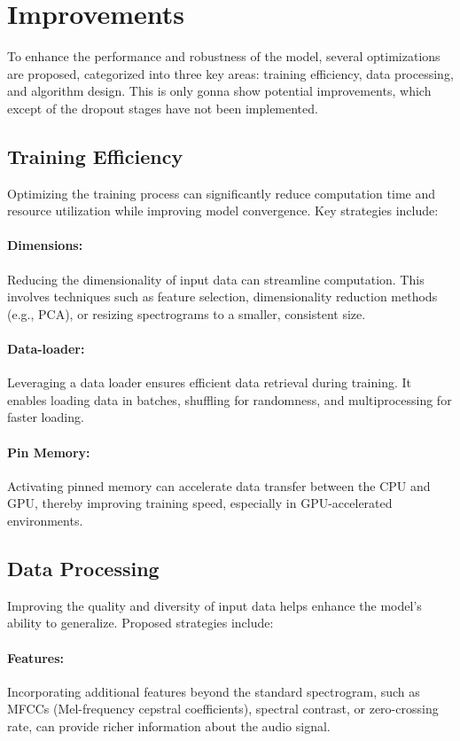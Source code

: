 \section{Improvements}
\label{sec:improvements}
To enhance the performance and robustness of the model, several optimizations are proposed, categorized into three key areas: training efficiency, data processing, and algorithm design. This is only gonna show potential improvements, which except of the dropout stages have not been implemented.

\subsection{Training Efficiency}
Optimizing the training process can significantly reduce computation time and resource utilization while improving model convergence. Key strategies include:

\paragraph{Dimensions:} Reducing the dimensionality of input data can streamline computation. This involves techniques such as feature selection, dimensionality reduction methods (e.g., PCA), or resizing spectrograms to a smaller, consistent size.

\paragraph{Data-loader:}Leveraging a data loader ensures efficient data retrieval during training. It enables loading data in batches, shuffling for randomness, and multiprocessing for faster loading.

\paragraph{Pin Memory:}Activating pinned memory can accelerate data transfer between the CPU and GPU, thereby improving training speed, especially in GPU-accelerated environments.


\subsection{Data Processing}
Improving the quality and diversity of input data helps enhance the model’s ability to generalize. Proposed strategies include:

\paragraph{Features:} Incorporating additional features beyond the standard spectrogram, such as MFCCs (Mel-frequency cepstral coefficients), spectral contrast, or zero-crossing rate, can provide richer information about the audio signal.
